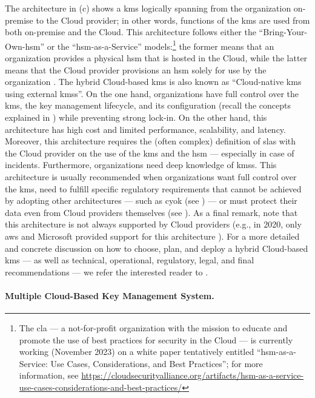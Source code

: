 The architecture in (c) shows a \gls{kms} logically spanning from the organization on-premise to the Cloud provider; in other words, functions of the \gls{kms} are used from both on-premise and the Cloud. This architecture follows either the ``Bring-Your-Own-\gls{hsm}'' or the ``\gls{hsm}-as-a-Service'' models:\footnote{The \gls{cla} --- a not-for-profit organization with the mission to educate and promote the use of best practices for security in the Cloud --- is currently working (November 2023) on a white paper tentatively entitled ``\gls{hsm}-as-a-Service: Use Cases, Considerations, and Best Practices''; for more information, see \url{https://cloudsecurityalliance.org/artifacts/hsm-as-a-service-use-cases-considerations-and-best-practices/}} the former means that an organization provides a physical \gls{hsm} that is hosted in the Cloud, while the latter means that the Cloud provider provisions an \gls{hsm} solely for use by the organization \cite{csa_key_2020}. The hybrid Cloud-based \gls{kms} is also known as ``Cloud-native \gls{kms} using external \glspl{kms}''. On the one hand, organizations have full control over the \gls{kms}, the key management lifecycle, and its configuration (recall the concepts explained in ) while preventing strong lock-in. On the other hand, this architecture has high cost and limited performance, scalability, and latency. Moreover, this architecture requires the (often complex) definition of \glspl{sla} with the Cloud provider on the use of the \gls{kms} and the \gls{hsm} --- especially in case of incidents. Furthermore, organizations need deep knowledge of \glspl{kms}. This architecture is usually recommended when organizations want full control over the \gls{kms}, need to fulfill specific regulatory requirements that cannot be achieved by adopting other architectures --- such as \gls{cyok} (see ) --- or must protect their data even from Cloud providers themselves (see ). As a final remark, note that this architecture is not always supported by Cloud providers (e.g., in 2020, only \gls{aws} and Microsoft provided support for this architecture \cite{csa_key_2020}). For a more detailed and concrete discussion on how to choose, plan, and deploy a hybrid Cloud-based \gls{kms} --- as well as technical, operational, regulatory, legal, and final recommendations --- we refer the interested reader to \cite{csa_recommendations_2022}.


\paragraph*{Multiple Cloud-Based Key Management System.}

